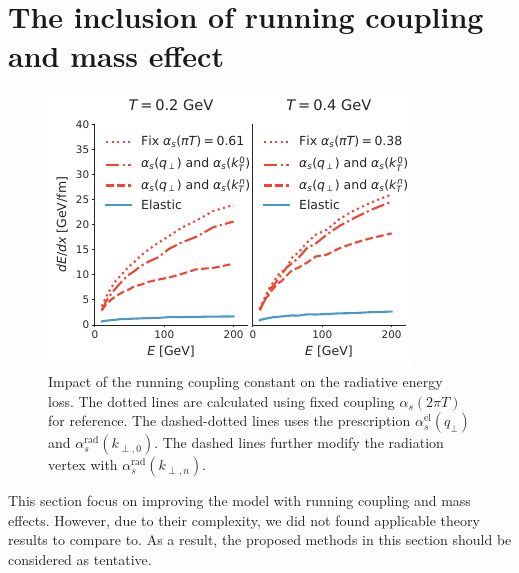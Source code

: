 \documentclass[aps, prc, reprint, amsmath, groupedaddress, nofootinbib]{revtex4-1}
\begin{document}
{\section{The inclusion of running coupling and mass effect}\label{section:disscuss}
\begin{figure}
\includegraphics[width=\columnwidth]{Eloss_infinite_run.pdf}
\caption{Impact of the running coupling constant on the radiative energy loss. The dotted lines are calculated using fixed coupling $\alpha_s(2\pi T)$ for reference. The dashed-dotted lines uses the prescription $\alpha_s^{\textrm{el}}(q_\perp)$ and $\alpha_s^{\textrm{rad}}(k_{\perp,0})$. The dashed lines further modify the radiation vertex with $\alpha_s^{\textrm{rad}}(k_{\perp,n})$.}
\label{fig:run}
\end{figure}
This section focus on improving the model with running coupling and mass effects. 
However, due to their complexity, we did not found applicable theory results to compare to.
As a result, the proposed methods in this section should be considered as tentative.

}
\end{document}
